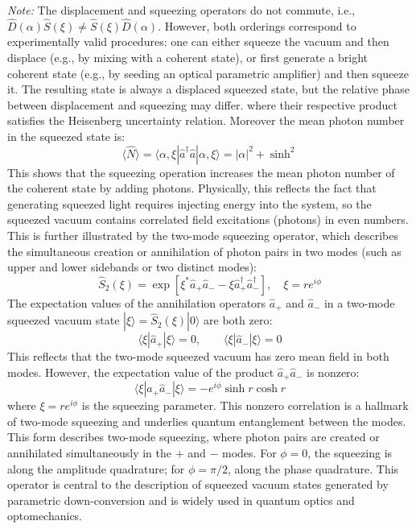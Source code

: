\textit{Note:} The displacement and squeezing operators do not commute, i.e., $\hat{D}(\alpha)\hat{S}(\xi) \neq \hat{S}(\xi)\hat{D}(\alpha)$. However, both orderings correspond to experimentally valid procedures: one can either squeeze the vacuum and then displace (e.g., by mixing with a coherent state), or first generate a bright coherent state (e.g., by seeding an optical parametric amplifier) and then squeeze it. The resulting state is always a displaced squeezed state, but the relative phase between displacement and squeezing may differ.
where their respective product satisfies the Heisenberg uncertainty relation. Moreover the mean photon number in the squeezed state is: 
\begin{equation}
\langle \hat{N} \rangle = \langle \alpha, \xi | \hat{a}^\dagger \hat{a} | \alpha, \xi \rangle = |\alpha|^2 + \sinh^2 
\end{equation}
This shows that the squeezing operation increases the mean photon number of the coherent state by adding photons. Physically, this reflects the fact that generating squeezed light requires injecting energy into the system, so the squeezed vacuum contains correlated field excitations (photons) in even numbers. This is further illustrated by the two-mode squeezing operator, which describes the simultaneous creation or annihilation of photon pairs in two modes (such as upper and lower sidebands or two distinct modes):
\begin{equation}
\hat{S}_2(\xi) = \exp\left[ \xi^* \hat{a}_{+} \hat{a}_{-} - \xi \hat{a}_{+}^\dagger \hat{a}_{-}^\dagger \right], \quad \xi = r e^{i\phi}
\end{equation}
The expectation values of the annihilation operators $\hat{a}_{+}$ and $\hat{a}_{-}$ in a two-mode squeezed vacuum state $|\xi\rangle = \hat{S}_2(\xi)|0\rangle$ are both zero:
\begin{equation}
\langle \xi | \hat{a}_{+} | \xi \rangle = 0, \qquad \langle \xi | \hat{a}_{-} | \xi \rangle = 0
\end{equation}
This reflects that the two-mode squeezed vacuum has zero mean field in both modes. However, the expectation value of the product $\hat{a}_{+} \hat{a}_{-}$ is nonzero:
\begin{equation}
\langle \xi | \hat{a}_{+} \hat{a}_{-} | \xi \rangle = -e^{i\phi} \sinh r \cosh r
\end{equation}
where $\xi = r e^{i\phi}$ is the squeezing parameter. This nonzero correlation is a hallmark of two-mode squeezing and underlies quantum entanglement between the modes.
This form describes two-mode squeezing, where photon pairs are created or annihilated simultaneously in the $+$ and $-$ modes. For $\phi = 0$, the squeezing is along the amplitude quadrature; for $\phi = \pi/2$, along the phase quadrature. This operator is central to the description of squeezed vacuum states generated by parametric down-conversion and is widely used in quantum optics and optomechanics.

